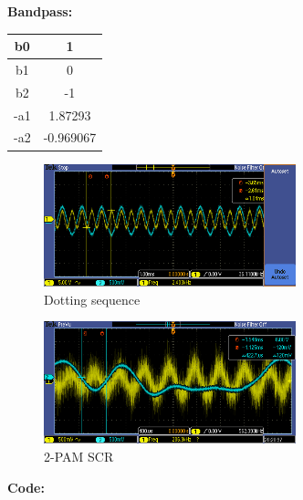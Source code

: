 \documentclass{article}
\begin{document}
\textbf{Bandpass:}

\begin{center}
\begin{tabular}{c|c}
b0	&	 1				\\ \hline
b1	&  0				\\ \hline
b2	& -1				\\ \hline
-a1	&	 1.87293\\ \hline
-a2	&	-0.969067
\end{tabular}
\end{center}

\begin{figure}[h]
  \begin{center}
    \includegraphics[width=0.65\textwidth]{img/dotting_sequence_SCR.png}
    \caption{Dotting sequence}
  \end{center}
\end{figure}

\begin{figure}[h]
  \begin{center}
    \includegraphics[width=0.65\textwidth]{img/2PAM_SCR.png}
    \caption{2-PAM SCR}
  \end{center}
\end{figure}

\pagebreak
\textbf{Code:}
\end{document}
